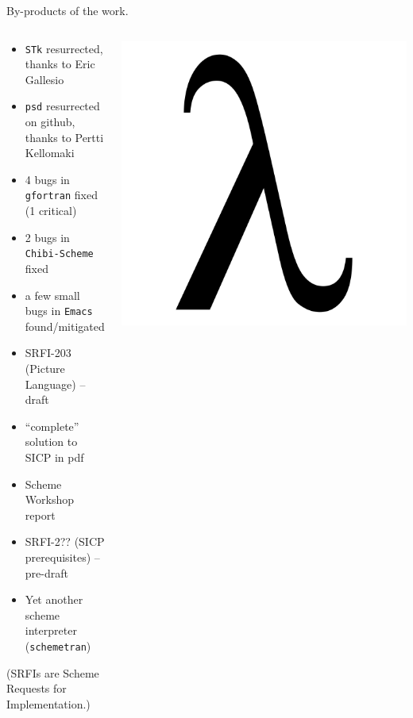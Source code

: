 \documentclass[presentation, CJK, compress,aspectratio=169]{beamer}
\begin{document}
\begin{frame}[label={sec:org07dd519},fragile,squeeze]{By-products of the work.}
 \begin{columns}
\begin{column}{0.6\columnwidth}
\begin{itemize}
\item \texttt{STk} \alert{resurrected}, thanks to Eric Gallesio
\item \texttt{psd} \alert{resurrected} on github, thanks to Pertti Kellomaki
\item \alert{4 bugs} in \texttt{gfortran} fixed (1 critical)
\item \alert{2 bugs} in \texttt{Chibi-Scheme} fixed
\item a few small \alert{bugs} in \texttt{Emacs} found/mitigated
\item \alert{SRFI-203} (Picture Language) -- draft
\item ``complete'' solution to SICP in pdf
\item Scheme Workshop \alert{report}
\item \alert{SRFI-2??} (SICP prerequisites) -- pre-draft
\item Yet another scheme \alert{interpreter} (\texttt{schemetran})
\end{itemize}

(SRFIs are Scheme Requests for Implementation.)
\end{column}

\begin{column}{0.4\columnwidth}
\begin{center}
\includegraphics[width=.9\linewidth]{by-products-lambda-from-wiki.png}
\end{center}
\end{column}
\end{columns}


\end{frame}
\end{document}
